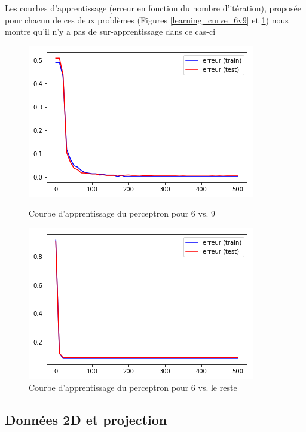 \documentclass[a4paper]{article}
\begin{document}
Les courbes d'apprentissage (erreur en fonction du nombre d'itération), proposée pour chacun de ces deux problèmes (Figures \ref{learning_curve_6v9} et \ref{learning_curve_6vAll}) nous montre qu'il n'y a pas de sur-apprentissage dans ce cas-ci

\begin{figure}[ht!]
\begin{center}
\begin{minipage}{0.45\textwidth}
\includegraphics[scale=0.5]{learning_curve_6v9.png}
\caption{Courbe d'apprentissage du perceptron pour 6 vs. 9}
\label{learning_curve_6v9}
\end{minipage}\hfill
\begin{minipage}{0.45\textwidth}
\includegraphics[scale=0.5]{learning_curve_6vAll.png}
\caption{Courbe d'apprentissage du perceptron pour 6 vs. le reste}
\label{learning_curve_6vAll}
\end{minipage}
\end{center}
\end{figure}

\subsection*{Données 2D et projection}
\end{document}
